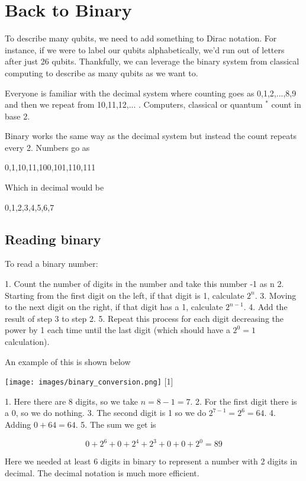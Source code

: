 \documentclass{book}
\begin{document}
\section{Back to Binary }


To describe many qubits, we need to add something to Dirac notation. For instance, if we were to label our qubits alphabetically, we'd run out of letters after just 26 qubits. Thankfully, we can leverage the binary system from classical computing to describe as many qubits as we want to. 


Everyone is familiar with the decimal system where counting goes as 0,1,2,...,8,9 and then we repeat from 10,11,12,... . Computers, classical or quantum $^*$ count in base 2. 

Binary works the same way as the decimal system but instead the count repeats every 2. Numbers go as    

0,1,10,11,100,101,110,111 \newline

Which in decimal would be 

0,1,2,3,4,5,6,7 

\subsection{ Reading binary }

To read a binary number:  
  
1. Count the number of digits in the number and take this number -1 as n
2. Starting from the first digit on the left, if that digit is 1, calculate $2^n$. 
3. Moving to the next digit on the right, if that digit has a 1, calculate $2^{n-1}$. 
4. Add the result of step 3 to step 2. 
5. Repeat this process for each digit decreasing the power by 1 each time until the last digit (which should have a $2^0 = 1$ calculation). 

An example of this is shown below


\texttt{[image: images/binary\_conversion.png]}
[1]

1. Here there are 8 digits, so we take $n = 8 - 1 = 7 $. 
2. For the first digit there is a 0, so we do nothing. 
3. The second digit is 1 so we do $2^{7-1} = 2^6 = 64$. 
4. Adding $0 + 64 = 64$.
5. The sum we get is

$$
0 + 2^6 +0  + 2^4 + 2^3+ 0 + 0 + 2^0 = 89 
$$

Here we needed at least 6 digits in binary to represent a number with 2 digits in decimal. The decimal notation is much more efficient. \newline
\end{document}
